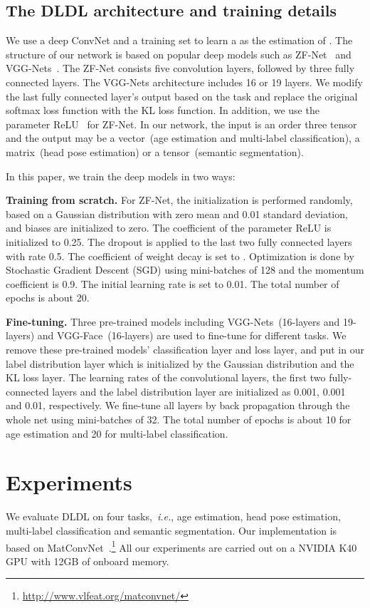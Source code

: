 \documentclass[journal]{IEEEtran}
\begin{document}
\subsection{The DLDL architecture and training details}

We use a deep ConvNet and a training set  to learn a  as the estimation of . The structure of our network is based on popular deep models such as ZF-Net~\cite{zeiler2014visualizing} and VGG-Nets~\cite{simonyan2015very}. The ZF-Net consists five convolution layers, followed by three fully connected layers.  The VGG-Nets architecture includes 16 or 19 layers. We modify the last fully connected layer's output based on the task and replace the original softmax loss function with the KL loss function. In addition, we use the parameter ReLU~\cite{he2015delving} for ZF-Net. In our network, the input is an order three tensor  and the output   may be a vector~(age estimation and multi-label classification), a matrix~(head pose estimation) or a tensor~(semantic segmentation).

In this paper, we train the deep models in two ways:

\textbf{Training from scratch.} For ZF-Net, the initialization is performed randomly, based on a Gaussian distribution with zero mean and 0.01 standard deviation, and biases are initialized to zero. The coefficient of the parameter ReLU is initialized to 0.25. The dropout is applied to the last two fully connected layers with rate 0.5. The coefficient of weight decay is set to . Optimization is done by Stochastic Gradient Descent (SGD) using mini-batches of 128 and the momentum coefficient is 0.9. The initial learning rate is set to 0.01. The total number of epochs is about 20.

\textbf{Fine-tuning.} Three pre-trained models including VGG-Nets~(16-layers and 19-layers) and VGG-Face~(16-layers) are used to fine-tune for different tasks. We remove these pre-trained models' classification layer and loss layer, and put in our label distribution layer which is initialized by the Gaussian distribution  and the KL loss layer. The learning rates of the convolutional layers, the first two fully-connected layers and the label distribution layer are initialized as 0.001, 0.001 and 0.01, respectively. We fine-tune all layers by back propagation through the whole net using mini-batches of 32. The total number of epochs is about 10 for age estimation and 20 for multi-label classification.

\section{Experiments}\label{sec:ex}
We evaluate DLDL on four tasks,~\emph{i.e.}, age estimation, head pose estimation, multi-label classification and semantic segmentation. Our implementation is based on MatConvNet~\cite{vedaldi15matconvnet}.\footnote{\url{http://www.vlfeat.org/matconvnet/}} All our experiments are carried out on a NVIDIA K40 GPU with 12GB of onboard memory.
\end{document}
